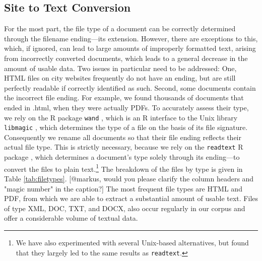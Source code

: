 \documentclass[11pt]{article}
\begin{document}
\subsection{Site to Text Conversion}
For the most part, the file type of a document can be correctly determined through the filename ending---its extension. However, there are exceptions to this, which, if ignored, can lead to large amounts of improperly formatted text, arising from incorrectly converted documents, which leads to a general decrease in the amount of usable data. Two issues in particular need to be addressed: One, HTML files on city websites frequently do not have an ending, but are still perfectly readable if correctly identified as such. Second, some documents contain the incorrect file ending. For example, we found thousands of documents that ended in .html, when they were actually PDFs. To accurately assess their type, we rely on the R package \texttt{wand} \citep{wand}, which is an R interface to the Unix library \texttt{libmagic} \citep{darwin2008libmagic}, which determines the type of a file on the basis of its file signature. Consequently we rename all documents so that their file ending reflects their actual file type. This is strictly necessary, because we rely on the \texttt{readtext} R package \citep{readtext}, which determines a document's type solely through its ending---to convert the files to plain text.\footnote{We have also experimented with several Unix-based alternatives, but found that they largely led to the same results as \texttt{readtext}.} The breakdown of the files by type is given in Table \ref{tab:filetypes}. [@markus, would you please clarify the column headers and "magic number" in the caption?]  The most frequent file types are HTML and PDF, from which we are able to extract a substantial amount of usable text. Files of type XML, DOC, TXT, and DOCX, also occur regularly in our corpus and offer a considerable volume of textual data.




\end{document}

